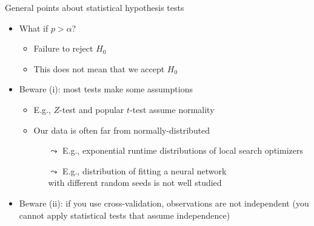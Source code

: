 \begin{frame}[c]{General points about statistical hypothesis tests}

\begin{itemize}
\item What if $p > \alpha$?
\begin{itemize}
\item \alert{Failure to reject $H_0$}
\item \alert{This does not mean that we accept $H_0$}
\end{itemize}


\pause
\bigskip
\item Beware (i): most tests make some assumptions
\begin{itemize}
\item E.g., $Z$-test and popular $t$-test assume \alert{normality}
\item Our data is often far from normally-distributed
\begin{itemize}
\item[$\leadsto$] E.g., exponential runtime distributions of local search optimizers
\item[$\leadsto$] E.g., distribution of fitting a neural network\\ with different random seeds is not well studied
\end{itemize}
\end{itemize}
\medskip
\pause
\item Beware (ii): if you use cross-validation, observations are not independent (you cannot apply statistical tests that assume independence)
\end{itemize}

\end{frame}
